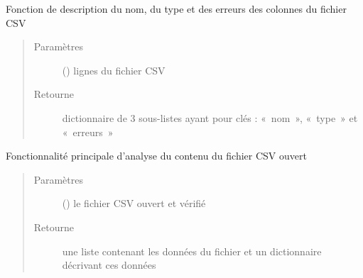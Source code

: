 \documentclass[letterpaper,10pt,french]{sphinxmanual}
\begin{document}

\begin{fulllineitems}
\label{\detokenize{analyseContenuFichier:chargement_des_donnees.analyseContenuFichier.removeDateSuffix}}
\end{fulllineitems}


\begin{fulllineitems}
\label{\detokenize{analyseContenuFichier:chargement_des_donnees.analyseContenuFichier.descriptionColonnes}}
Fonction de description du nom, du type et des erreurs des colonnes du fichier CSV
\begin{quote}\begin{description}
\item[{Paramètres}] \leavevmode
{} () \textendash{} lignes du fichier CSV

\item[{Retourne}] \leavevmode
dictionnaire de 3 sous-listes ayant pour clés : « nom », « type » et « erreurs »

\end{description}\end{quote}

\end{fulllineitems}


\begin{fulllineitems}
\label{\detokenize{analyseContenuFichier:chargement_des_donnees.analyseContenuFichier.analyseFichier}}
Fonctionnalité principale d’analyse du contenu du fichier CSV ouvert
\begin{quote}\begin{description}
\item[{Paramètres}] \leavevmode
{} () \textendash{} le fichier CSV ouvert et vérifié

\item[{Retourne}] \leavevmode
une liste contenant les données du fichier et un dictionnaire décrivant ces données

\end{description}\end{quote}

\end{fulllineitems}
\end{document}
